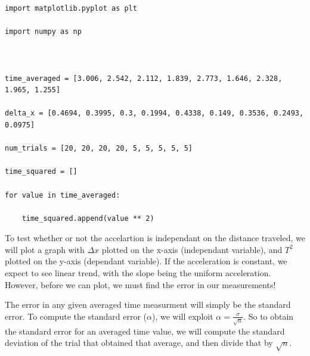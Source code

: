 \documentclass[12pt]{article}
\begin{document}
\bigskip
 
\begin{lstlisting}[frame=shadowbox]
import matplotlib.pyplot as plt

import numpy as np



time_averaged = [3.006, 2.542, 2.112, 1.839, 2.773, 1.646, 2.328, 1.965, 1.255]

delta_x = [0.4694, 0.3995, 0.3, 0.1994, 0.4338, 0.149, 0.3536, 0.2493, 0.0975]

num_trials = [20, 20, 20, 20, 5, 5, 5, 5, 5]

time_squared = []

for value in time_averaged:

    time_squared.append(value ** 2)

\end{lstlisting}
\medskip

To test whether or not the accelartion is independant on the distance traveled, we will plot a graph with $\Delta x$ plotted on the x-axis (independant variable), and $T^2$ plotted on the y-axis (dependant variable). If the acceleration is constant, we expect to see linear trend, with the slope being the uniform acceleration. However, before we can plot, we must find the error in our measurements!


The error in any given averaged time measurment will simply be the standard error. To compute the standard error ($\alpha$), we will exploit  $\alpha = \frac{\sigma}{\sqrt{n}}$. So to obtain the standard error for an averaged time value, we will compute the standard deviation of the trial that obtained that average, and then divide that by $\sqrt{n}$.

\bigskip
 
\end{document}
